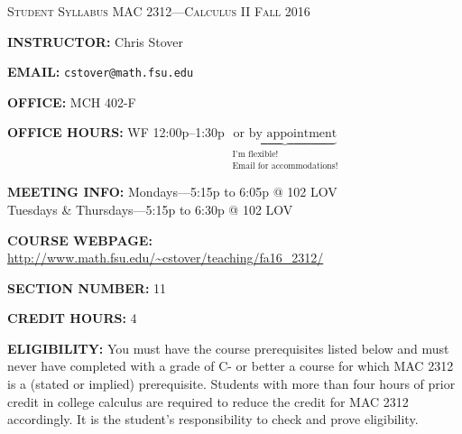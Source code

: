 \documentclass[12pt,oneside]{amsart}
\begin{document}

\centerline{\large\textsc{Student Syllabus} \hfill \textsc{MAC 2312---Calculus II} \hfill \textsc{Fall 2016}}\vspace{3mm}

\noindent \textbf{INSTRUCTOR:} Chris Stover%

\noindent \textbf{EMAIL:} \texttt{cstover@math.fsu.edu}%

\noindent \textbf{OFFICE:} MCH 402-F%

\noindent \textbf{OFFICE HOURS:} WF 12:00p--1:30p $\underbrace{\text{or by appointment}}_{\substack{\text{I'm flexible!}\\\text{Email for accommodations!}}}$


\noindent \textbf{MEETING INFO:} Mondays---5:15p to 6:05p @ 102 LOV\\
\indent \hspace{35.5mm}Tuesdays \& Thursdays---5:15p to 6:30p @ 102 LOV%

\noindent \textbf{COURSE WEBPAGE:} \url{http://www.math.fsu.edu/~cstover/teaching/fa16_2312/}%

\noindent \textbf{SECTION NUMBER:} 11%

\noindent \textbf{CREDIT HOURS:} 4


\noindent \textbf{ELIGIBILITY:} You must have the course prerequisites listed below and must never have completed with a grade of C- or better a course for which MAC 2312 is a (stated or implied) prerequisite.  Students with more than four
hours of prior credit in college calculus are required to reduce the credit for MAC 2312 accordingly. It is the student's responsibility to check and prove eligibility.
\end{document}
